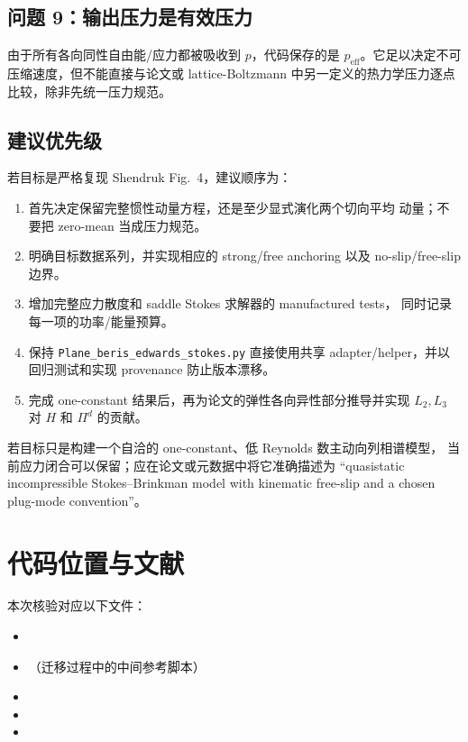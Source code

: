 \documentclass[UTF8,11pt,a4paper]{ctexart}
\begin{document}
\subsection{问题 9：输出压力是有效压力}

由于所有各向同性自由能/应力都被吸收到 $p$，代码保存的是
$p_{\mathrm{eff}}$。它足以决定不可压缩速度，但不能直接与论文或
lattice-Boltzmann 中另一定义的热力学压力逐点比较，除非先统一压力规范。

\subsection{建议优先级}

若目标是严格复现 Shendruk Fig.~4，建议顺序为：
\begin{enumerate}
  \item 首先决定保留完整惯性动量方程，还是至少显式演化两个切向平均
        动量；不要把 zero-mean 当成压力规范。
  \item 明确目标数据系列，并实现相应的 strong/free anchoring 以及
        no-slip/free-slip 边界。
  \item 增加完整应力散度和 saddle Stokes 求解器的 manufactured tests，
        同时记录每一项的功率/能量预算。
  \item 保持 \texttt{Plane\_beris\_edwards\_stokes.py} 直接使用共享
        adapter/helper，并以回归测试和实现 provenance 防止版本漂移。
  \item 完成 one-constant 结果后，再为论文的弹性各向异性部分推导并实现
        $L_2,L_3$ 对 $H$ 和 $\Pi^d$ 的贡献。
\end{enumerate}
若目标只是构建一个自洽的 one-constant、低 Reynolds 数主动向列相谱模型，
当前应力闭合可以保留；应在论文或元数据中将它准确描述为
``quasistatic incompressible Stokes--Brinkman model with kinematic
free-slip and a chosen plug-mode convention''。

\section{代码位置与文献}

本次核验对应以下文件：
\begin{itemize}
  \item {}
  \item {}
        （迁移过程中的中间参考脚本）
  \item {}
  \item {}
  \item {}
\end{itemize}
\end{document}
